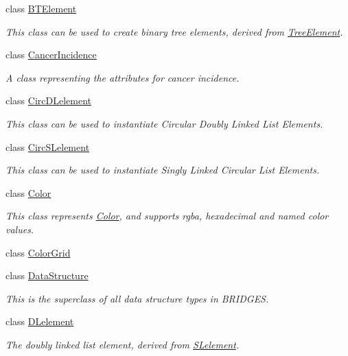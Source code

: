 \begin{DoxyCompactItemize}
class \hyperlink{classbridges_1_1_b_t_element}{B\+T\+Element}
\begin{DoxyCompactList}\small\item\em This class can be used to create binary tree elements, derived from \hyperlink{classbridges_1_1_tree_element}{Tree\+Element}. \end{DoxyCompactList}\item 
class \hyperlink{classbridges_1_1_cancer_incidence}{Cancer\+Incidence}
\begin{DoxyCompactList}\small\item\em A class representing the attributes for cancer incidence. \end{DoxyCompactList}\item 
class \hyperlink{classbridges_1_1_circ_d_lelement}{Circ\+D\+Lelement}
\begin{DoxyCompactList}\small\item\em This class can be used to instantiate Circular Doubly Linked List Elements. \end{DoxyCompactList}\item 
class \hyperlink{classbridges_1_1_circ_s_lelement}{Circ\+S\+Lelement}
\begin{DoxyCompactList}\small\item\em This class can be used to instantiate Singly Linked Circular List Elements. \end{DoxyCompactList}\item 
class \hyperlink{classbridges_1_1_color}{Color}
\begin{DoxyCompactList}\small\item\em This class represents \hyperlink{classbridges_1_1_color}{Color}, and supports rgba, hexadecimal and named color values. \end{DoxyCompactList}\item 
class \hyperlink{classbridges_1_1_color_grid}{Color\+Grid}
\item 
class \hyperlink{classbridges_1_1_data_structure}{Data\+Structure}
\begin{DoxyCompactList}\small\item\em This is the superclass of all data structure types in B\+R\+I\+D\+G\+E\+S. \end{DoxyCompactList}\item 
class \hyperlink{classbridges_1_1_d_lelement}{D\+Lelement}
\begin{DoxyCompactList}\small\item\em The doubly linked list element, derived from \hyperlink{classbridges_1_1_s_lelement}{S\+Lelement}. \end{DoxyCompactList}\item 

\end{DoxyCompactItemize}
